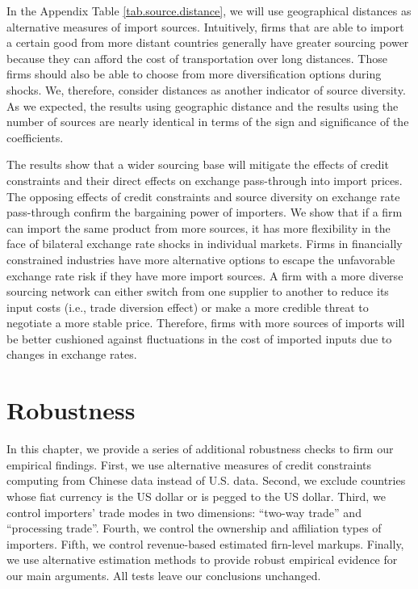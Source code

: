 In the Appendix Table \ref{tab.source.distance}, we will use geographical distances as alternative measures of import sources. Intuitively, firms that are able to import a certain good from more distant countries generally have greater sourcing power because they can afford the cost of transportation over long distances. Those firms should also be able to choose from more diversification options during shocks. We, therefore, consider distances as another indicator of source diversity. As we expected, the results using geographic distance and the results using the number of sources are nearly identical in terms of the sign and significance of the coefficients.

The results show that a wider sourcing base will mitigate the effects of credit constraints and their direct effects on exchange pass-through into import prices. The opposing effects of credit constraints and source diversity on exchange rate pass-through confirm the bargaining power of importers. We show that if a firm can import the same product from more sources, it has more flexibility in the face of bilateral exchange rate shocks in individual markets. Firms in financially constrained industries have more alternative options to escape the unfavorable exchange rate risk if they have more import sources. A firm with a more diverse sourcing network can either switch from one supplier to another to reduce its input costs (i.e., trade diversion effect) or make a more credible threat to negotiate a more stable price. Therefore, firms with more sources of imports will be better cushioned against fluctuations in the cost of imported inputs due to changes in exchange rates.

\section{Robustness} \label{Robustness}

In this chapter, we provide a series of additional robustness checks to firm our empirical findings. First, we use alternative measures of credit constraints computing from Chinese data instead of U.S. data. Second, we exclude countries whose fiat currency is the US dollar or is pegged to the US dollar. Third, we control importers' trade modes in two dimensions: ``two-way trade'' and ``processing trade''. Fourth, we control the ownership and affiliation types of importers. Fifth, we control revenue-based estimated firn-level markups. Finally, we use alternative estimation methods to provide robust empirical evidence for our main arguments. All tests leave our conclusions unchanged.

